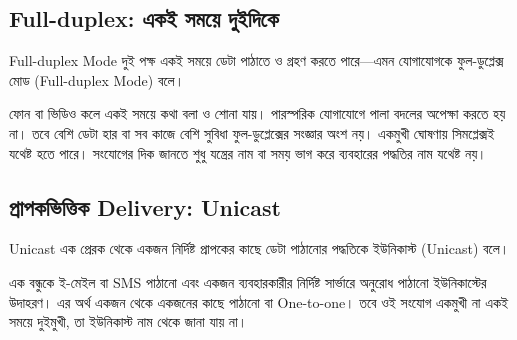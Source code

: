 \subsection{Full-duplex: একই সময়ে দুইদিকে}
\label{ch2:c02-10}
\begin{definitionbox}{Full-duplex Mode}
দুই পক্ষ একই সময়ে ডেটা পাঠাতে ও গ্রহণ করতে পারে—এমন যোগাযোগকে ফুল-ডুপ্লেক্স মোড (Full-duplex Mode) বলে।
\end{definitionbox}
ফোন বা ভিডিও কলে একই সময়ে কথা বলা ও শোনা যায়। পারস্পরিক যোগাযোগে পালা বদলের অপেক্ষা করতে হয় না। তবে বেশি ডেটা হার বা সব কাজে বেশি সুবিধা ফুল-ডুপ্লেক্সের সংজ্ঞার অংশ নয়। একমুখী ঘোষণায় সিমপ্লেক্সই যথেষ্ট হতে পারে। সংযোগের দিক জানতে শুধু যন্ত্রের নাম বা সময় ভাগ করে ব্যবহারের পদ্ধতির নাম যথেষ্ট নয়।

\subsection{প্রাপকভিত্তিক Delivery: Unicast}
\label{ch2:c02-11}
\begin{definitionbox}{Unicast}
এক প্রেরক থেকে একজন নির্দিষ্ট প্রাপকের কাছে ডেটা পাঠানোর পদ্ধতিকে ইউনিকাস্ট (Unicast) বলে।
\end{definitionbox}
এক বন্ধুকে ই-মেইল বা SMS পাঠানো এবং একজন ব্যবহারকারীর নির্দিষ্ট সার্ভারে অনুরোধ পাঠানো ইউনিকাস্টের উদাহরণ। এর অর্থ একজন থেকে একজনের কাছে পাঠানো বা One-to-one। তবে ওই সংযোগ একমুখী না একই সময়ে দুইমুখী, তা ইউনিকাস্ট নাম থেকে জানা যায় না।

